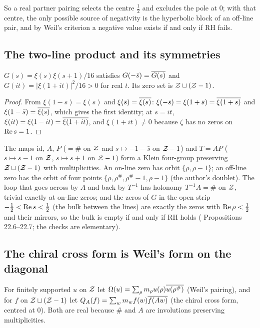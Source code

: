 So a real partner pairing selects the centre $\tfrac12$ and excludes the pole at $0$; with that centre, the only possible source of negativity is the hyperbolic block of an off-line pair, and by Weil's criterion \cite{Weil,Bombieri} a negative value exists if and only if RH fails.

\subsection{The two-line product and its symmetries}

\begin{proposition}\label{prop:G}
$G(s)=\xi(s)\xi(s+1)/16$ satisfies $G(-\bar s)=\overline{G(s)}$ and $G(it)=|\xi(1+it)|^2/16>0$ for real $t$. Its zero set is $\mathcal{Z}\sqcup(\mathcal{Z}-1)$.
\end{proposition}

\begin{proof}
From $\xi(1-s)=\xi(s)$ and $\xi(\bar s)=\overline{\xi(s)}$: $\xi(-\bar s)=\xi(1+\bar s)=\overline{\xi(1+s)}$ and $\xi(1-\bar s)=\overline{\xi(s)}$, which gives the first identity; at $s=it$, $\xi(it)=\xi(1-it)=\overline{\xi(1+it)}$, and $\xi(1+it)\ne0$ because $\zeta$ has no zeros on $\operatorname{Re} s=1$.
\end{proof}

The maps $\mathrm{id}$, $A$, $P$ ($=\#$ on $\mathcal{Z}$ and $s\mapsto-1-\bar s$ on $\mathcal{Z}-1$) and $T=AP$ ($s\mapsto s-1$ on $\mathcal{Z}$, $s\mapsto s+1$ on $\mathcal{Z}-1$) form a Klein four-group preserving $\mathcal{Z}\sqcup(\mathcal{Z}-1)$ with multiplicities. An on-line zero has orbit $\{\rho,\rho-1\}$; an off-line zero has the orbit of four points $\{\rho,\rho^\#,\rho^\#-1,\rho-1\}$ (the author's doublet). The loop that goes across by $A$ and back by $T^{-1}$ has holonomy $T^{-1}A=\#$ on $\mathcal{Z}$, trivial exactly at on-line zeros; and the zeros of $G$ in the open strip $-\tfrac12<\operatorname{Re} s<\tfrac12$ (the bulk between the lines) are exactly the zeros with $\operatorname{Re}\rho<\tfrac12$ and their mirrors, so the bulk is empty if and only if RH holds ( Propositions 22.6--22.7; the checks are elementary).

\subsection{The chiral cross form is Weil's form on the diagonal}

For finitely supported $u$ on $\mathcal{Z}$ let $\Omega(u)=\sum_\rho m_\rho u(\rho)\overline{u(\rho^\#)}$ (Weil's pairing), and for $f$ on $\mathcal{Z}\sqcup(\mathcal{Z}-1)$ let $Q_A(f)=\sum_wm_wf(w)\overline{f(Aw)}$ (the chiral cross form, centred at $0$). Both are real because $\#$ and $A$ are involutions preserving multiplicities.

